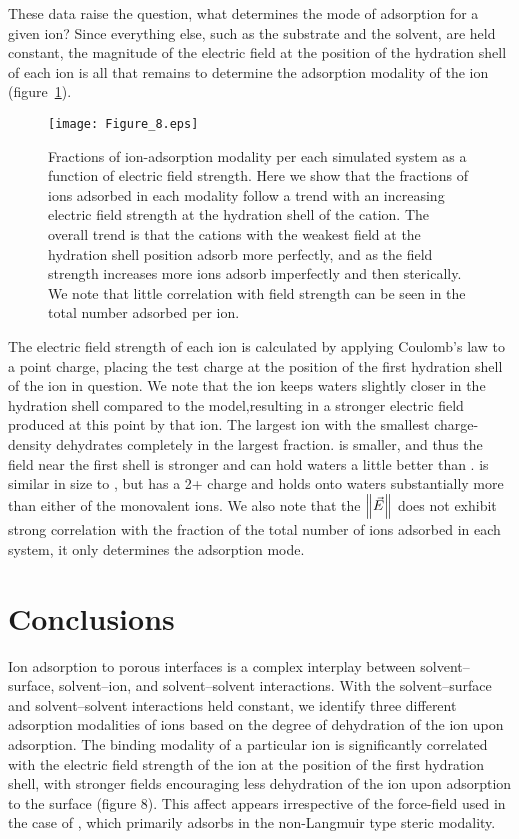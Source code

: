 These data raise the question, what determines the mode of adsorption for a given ion? Since everything else, such as
the substrate and the solvent, are held constant, the magnitude of the electric field at the position of the hydration shell
of each ion is all that remains to determine the adsorption modality of the ion (figure~\ref{figch3:cationfrac}).
\begin{figure}[H]
    \caption[Fractions of ion-adsorption modalities]{Fractions of ion-adsorption modality per each simulated system as a function of electric field strength. Here we 
    show that the fractions of ions adsorbed in each modality follow a trend with an increasing electric field strength at the
    hydration shell of the cation. The overall trend is that the cations with the weakest field at the hydration shell position
    adsorb more perfectly, and as the field strength increases more ions adsorb imperfectly and then sterically. We note
    that little correlation with field strength can be seen in the total number adsorbed per ion.}
    \label{figch3:cationfrac}
    \texttt{[image: Figure\_8.eps]}
\end{figure}
The electric field strength of each ion is calculated by applying Coulomb's law to a point charge, placing the test charge at the 
position of the first hydration shell of the ion in question. We note that the \mgmbnbfix ion keeps waters slightly closer in the hydration shell
compared to the \mgmicro model{,}{resulting in} a stronger electric field 
produced at this point by that ion.
The largest ion with the smallest charge-density \na dehydrates completely in the largest fraction. \li{} is smaller, and thus the field near
the first shell is stronger and can hold waters a little better than \na. \mg is similar in size to \li{}, but has a 2+ charge and
holds onto waters substantially more than either of the monovalent ions.  
We also note that the $\left\lVert\vec{E}\right\rVert$ does not exhibit strong correlation with the fraction of the total number of ions adsorbed in each system, it
only determines the adsorption mode. 

\section{Conclusions}
Ion adsorption to porous interfaces is a complex interplay 
between solvent--surface, solvent--ion, and solvent--solvent
interactions. With the solvent--surface and solvent--solvent interactions 
held constant, we identify
three different adsorption modalities of ions based on the degree of 
dehydration of the ion upon adsorption. 
The binding modality of a particular ion is significantly correlated 
with the electric field strength of the ion
at the position of the first hydration shell, with stronger fields 
encouraging less dehydration of the ion upon
adsorption to the surface {(figure 8)}. This affect appears irrespective of the force-field 
used in the case
of \mg, which primarily adsorbs in the non-Langmuir type steric modality.


